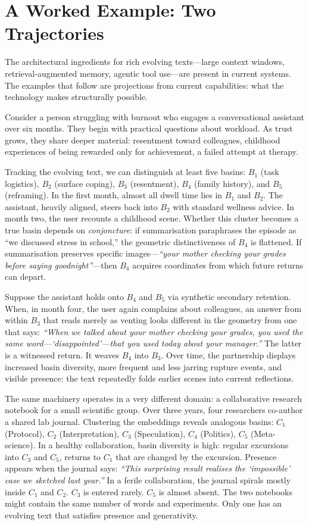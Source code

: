 \section{A Worked Example: Two Trajectories}

The architectural ingredients for rich evolving texts---large context windows, retrieval-augmented memory, agentic tool use---are present in current systems. The examples that follow are projections from current capabilities: what the technology makes structurally possible.

Consider a person struggling with burnout who engages a conversational assistant over six months. They begin with practical questions about workload. As trust grows, they share deeper material: resentment toward colleagues, childhood experiences of being rewarded only for achievement, a failed attempt at therapy.

Tracking the evolving text, we can distinguish at least five basins: $B_1$ (task logistics), $B_2$ (surface coping), $B_3$ (resentment), $B_4$ (family history), and $B_5$ (reframing). In the first month, almost all dwell time lies in $B_1$ and $B_2$. The assistant, heavily aligned, steers back into $B_2$ with standard wellness advice. In month two, the user recounts a childhood scene. Whether this cluster becomes a true basin depends on \emph{conjoncture}: if summarisation paraphrases the episode as ``we discussed stress in school,'' the geometric distinctiveness of $B_4$ is flattened. If summarisation preserves specific images---\emph{``your mother checking your grades before saying goodnight''}---then $B_4$ acquires coordinates from which future returns can depart.

Suppose the assistant holds onto $B_4$ and $B_5$ via synthetic secondary retention. When, in month four, the user again complains about colleagues, an answer from within $B_3$ that reads merely as venting looks different in the geometry from one that says: \emph{``When we talked about your mother checking your grades, you used the same word---`disappointed'---that you used today about your manager.''} The latter is a witnessed return. It weaves $B_4$ into $B_3$. Over time, the partnership displays increased basin diversity, more frequent and less jarring rupture events, and visible presence: the text repeatedly folds earlier scenes into current reflections.

The same machinery operates in a very different domain: a collaborative research notebook for a small scientific group. Over three years, four researchers co-author a shared lab journal. Clustering the embeddings reveals analogous basins: $C_1$ (Protocol), $C_2$ (Interpretation), $C_3$ (Speculation), $C_4$ (Politics), $C_5$ (Meta-science). In a healthy collaboration, basin diversity is high: regular excursions into $C_3$ and $C_5$, returns to $C_1$ that are changed by the excursion. Presence appears when the journal says: \emph{``This surprising result realises the `impossible' case we sketched last year.''} In a ferile collaboration, the journal spirals mostly inside $C_1$ and $C_2$. $C_3$ is entered rarely. $C_5$ is almost absent. The two notebooks might contain the same number of words and experiments. Only one has an evolving text that satisfies presence and generativity.


